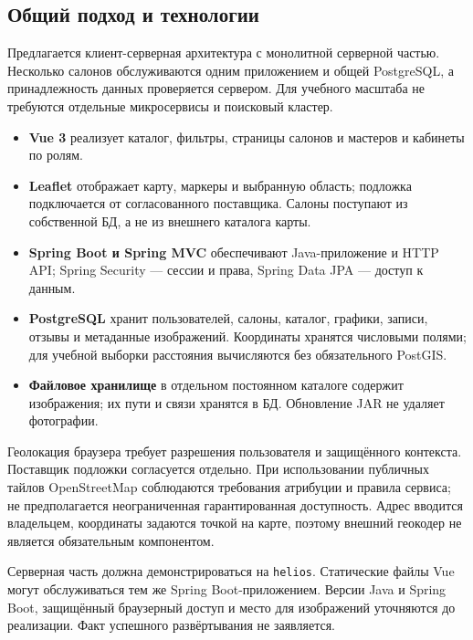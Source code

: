 \subsection{Общий подход и технологии}
Предлагается клиент-серверная архитектура с монолитной серверной частью. Несколько салонов обслуживаются одним приложением и общей PostgreSQL, а принадлежность данных проверяется сервером. Для учебного масштаба не требуются отдельные микросервисы и поисковый кластер.
\begin{itemize}
\item \textbf{Vue 3} реализует каталог, фильтры, страницы салонов и мастеров и кабинеты по ролям.
\item \textbf{Leaflet} отображает карту, маркеры и выбранную область; подложка подключается от согласованного поставщика. Салоны поступают из собственной БД, а не из внешнего каталога карты.
\item \textbf{Spring Boot и Spring MVC} обеспечивают Java-приложение и HTTP API; Spring Security --- сессии и права, Spring Data JPA --- доступ к данным.
\item \textbf{PostgreSQL} хранит пользователей, салоны, каталог, графики, записи, отзывы и метаданные изображений. Координаты хранятся числовыми полями; для учебной выборки расстояния вычисляются без обязательного PostGIS.
\item \textbf{Файловое хранилище} в отдельном постоянном каталоге содержит изображения; их пути и связи хранятся в БД. Обновление JAR не удаляет фотографии.
\end{itemize}
Геолокация браузера требует разрешения пользователя и защищённого контекста. Поставщик подложки согласуется отдельно. При использовании публичных тайлов OpenStreetMap соблюдаются требования атрибуции и правила сервиса; не предполагается неограниченная гарантированная доступность. Адрес вводится владельцем, координаты задаются точкой на карте, поэтому внешний геокодер не является обязательным компонентом.

Серверная часть должна демонстрироваться на \texttt{helios}. Статические файлы Vue могут обслуживаться тем же Spring Boot-приложением. Версии Java и Spring Boot, защищённый браузерный доступ и место для изображений уточняются до реализации. Факт успешного развёртывания не заявляется.

